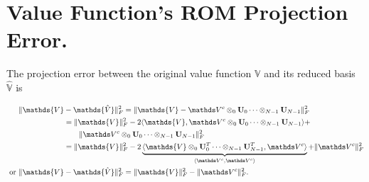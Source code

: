 \section{Value Function's ROM Projection Error.}
\label{app:ortho_proj_error}

The projection error between the original value function $\mathds{V}$ and its reduced basis $\mathds{\hat{V}}$ is

\begin{align}
	\|\mathds{V} &- \mathds{\hat{V}}\|_F^2 = \|\mathds{V} - \valuecore \otimes_0 \mathbf{U}_0  \cdots \otimes_{N-1} \mathbf{U}_{N-1} \|_F^2 \nonumber \\
	&= \|\mathds{V} \|_F^2 - 2 \langle \mathds{V}, \valuecore \otimes_0 \mathbf{U}_0   \cdots \otimes_{N-1} \mathbf{U}_{N-1}\rangle  + \nonumber \\
	& \qquad \|\valuecore \otimes_0 \mathbf{U}_0   \cdots \otimes_{N-1} \mathbf{U}_{N-1}\|_F^2  \\
	&= \|\mathds{V} \|_F^2 - 2 \underbrace{\langle \mathds{V} \otimes_0 \mathbf{U}_0^T   \cdots \otimes_{N-1} \mathbf{U}_{N-1}^T, \valuecore \rangle}_{\langle \valuecore, \valuecore \rangle}   +  \|\valuecore\|_F^2 \nonumber \\
	\text{ or } \|\mathds{V} &- \mathds{\hat{V}}\|_F^2	= \|\mathds{V} \|_F^2  -  \|\valuecore\|_F^2. 
	\label{eq:value_approx}
\end{align}
